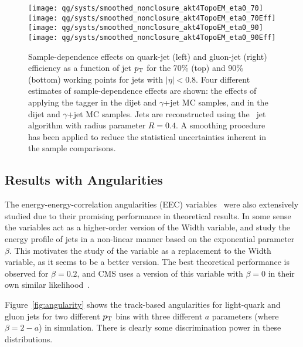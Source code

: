 \begin{figure*}[htbp]
\begin{center}
\texttt{[image: qg/systs/smoothed\_nonclosure\_akt4TopoEM\_eta0\_70]}
\texttt{[image: qg/systs/smoothed\_nonclosure\_akt4TopoEM\_eta0\_70Eff]} \\
\texttt{[image: qg/systs/smoothed\_nonclosure\_akt4TopoEM\_eta0\_90]}
\texttt{[image: qg/systs/smoothed\_nonclosure\_akt4TopoEM\_eta0\_90Eff]} \\
\caption{ Sample-dependence effects on quark-jet (left) and gluon-jet (right) efficiency as a function
of jet $p_{\text{T}}$ for the 70\% (top) and 90\% (bottom) working points for jets with $|\eta|<0.8$.  Four different estimates
of sample-dependence effects are shown: the effects of applying the tagger in the 
dijet and $\gamma$+jet  MC samples, and in the dijet and $\gamma$+jet \Herwigpp MC samples.  
Jets are reconstructed using the \AKT\ jet algorithm with radius parameter $R=0.4$. 
A smoothing procedure has been applied to reduce the statistical uncertainties inherent in the
sample comparisons. 
}
\label{fig:jet-reconstruction:qg:extractSyst2}
\end{center}
\end{figure*}

\FloatBarrier

\subsection{Results with Angularities}

The energy-energy-correlation angularities (EEC) variables~\cite{EEC} were also extensively studied due to their promising performance in theoretical results. In some sense the variables act as a higher-order version of the Width variable, and study the energy profile of jets in a non-linear manner based on the exponential parameter $\beta$. This motivates the study of the variable as a replacement to the Width variable, as it seems to be a better version. The best theoretical performance is observed for $\beta = 0.2$, and CMS uses a version of this variable with $\beta = 0$ in their own similar likelihood~\cite{CMS:2013kfa}. 

Figure~\ref{fig:angularity} shows the  track-based angularities for
light-quark and gluon jets for two different $p_{\text{T}}$ bins with three different $a$ parameters (where $\beta = 2 - a$) in \Pythia simulation. There is clearly some discrimination power in these distributions.

